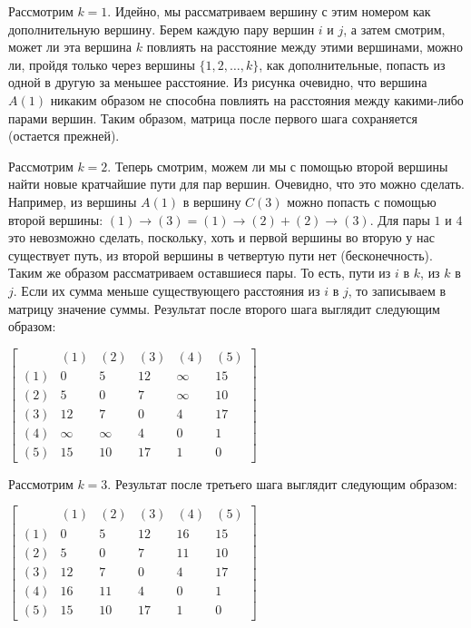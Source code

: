 \documentclass[12pt]{article}
\begin{document}
Рассмотрим $k = 1$.
Идейно, мы рассматриваем вершину с этим номером как дополнительную вершину. Берем каждую пару вершин $i$ и $j$, а затем смотрим, может ли эта вершина $k$ повлиять на расстояние между этими вершинами, можно ли, пройдя только через вершины $\{1,2,\ldots ,k\}$, как дополнительные, попасть из одной в другую за меньшее расстояние. Из рисунка очевидно, что вершина $A (1)$ никаким образом не способна повлиять на расстояния между какими-либо парами вершин. Таким образом, матрица после первого шага сохраняется (остается прежней).

Рассмотрим $k = 2$.
Теперь смотрим, можем ли мы с помощью второй вершины найти новые кратчайшие пути для пар вершин. Очевидно, что это можно сделать. Например, из вершины $A (1)$ в вершину $C (3)$ можно попасть с помощью второй вершины: $(1)\rightarrow(3) = (1)\rightarrow(2) + (2)\rightarrow(3)$.
Для пары $1$ и $4$ это невозможно сделать, поскольку, хоть и первой вершины во вторую у нас существует путь, из второй вершины в четвертую пути нет (бесконечность).
Таким же образом рассматриваем оставшиеся пары. То есть, пути из $i$ в $k$, из $k$ в $j$. Если их сумма меньше существующего расстояния из $i$ в $j$, то записываем в матрицу значение суммы.
Результат после второго шага выглядит следующим образом:
\begin{center}
  $\begin{bmatrix}
     & (1)& (2)& (3)& (4)& (5)\\
    (1)& 0& 5& 12& \infty& 15\\
    (2)& 5& 0& 7& \infty& 10\\
    (3)& 12& 7& 0& 4& 17\\
    (4)& \infty& \infty& 4& 0& 1\\
    (5)& 15& 10& 17& 1& 0 
  \end{bmatrix}$
  \end{center}

Рассмотрим $k = 3$.
Результат после третьего шага выглядит следующим образом:
\begin{center}
  $\begin{bmatrix}
     & (1)& (2)& (3)& (4)& (5)\\
    (1)& 0& 5& 12& 16& 15\\
    (2)& 5& 0& 7& 11& 10\\
    (3)& 12& 7& 0& 4& 17\\
    (4)& 16& 11& 4& 0& 1\\
    (5)& 15& 10& 17& 1& 0 
  \end{bmatrix}$
  \end{center}
\end{document}
